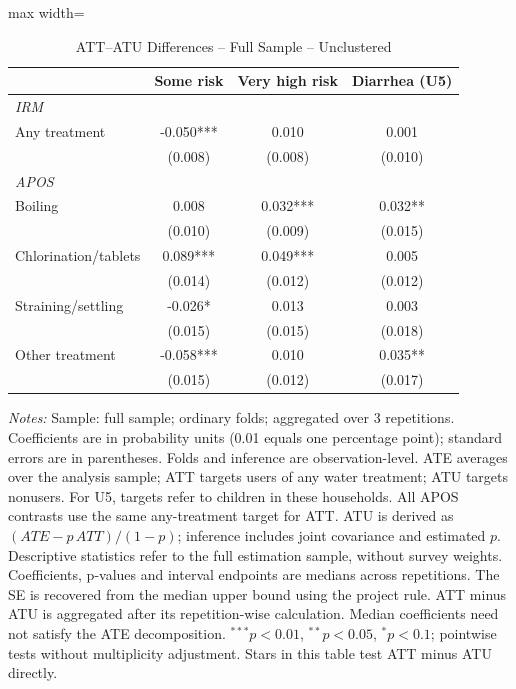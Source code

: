 \documentclass[10pt]{article}
\begin{document}
\clearpage
\begin{table}[H]
\centering
\caption{ATT--ATU Differences -- Full Sample -- Unclustered}
\label{tab:ate-att-atu-iid-aggregated-difference}
\scriptsize
\setlength{\tabcolsep}{4pt}
\renewcommand{\arraystretch}{0.92}
\begin{adjustbox}{max width=\linewidth}
\begin{tabular}{lccc}
\hline\hline
 & Some risk & Very high risk & Diarrhea (U5) \\
\midrule
\multicolumn{4}{l}{\textit{IRM}} \\
Any treatment & -0.050*** & 0.010 & 0.001 \\
 & (0.008) & (0.008) & (0.010) \\
\midrule
\multicolumn{4}{l}{\textit{APOS}} \\
Boiling & 0.008 & 0.032*** & 0.032** \\
 & (0.010) & (0.009) & (0.015) \\
Chlorination/tablets & 0.089*** & 0.049*** & 0.005 \\
 & (0.014) & (0.012) & (0.012) \\
Straining/settling & -0.026* & 0.013 & 0.003 \\
 & (0.015) & (0.015) & (0.018) \\
Other treatment & -0.058*** & 0.010 & 0.035** \\
 & (0.015) & (0.012) & (0.017) \\
\hline\hline
\end{tabular}
\end{adjustbox}
\par\vspace{3pt}
\begin{minipage}{\linewidth}\scriptsize \textit{Notes:} Sample: full sample; ordinary folds; aggregated over 3 repetitions. Coefficients are in probability units (0.01 equals one percentage point); standard errors are in parentheses. Folds and inference are observation-level. ATE averages over the analysis sample; ATT targets users of any water treatment; ATU targets nonusers. For U5, targets refer to children in these households. All APOS contrasts use the same any-treatment target for ATT. ATU is derived as $(ATE-p\,ATT)/(1-p)$; inference includes joint covariance and estimated $p$. Descriptive statistics refer to the full estimation sample, without survey weights. Coefficients, p-values and interval endpoints are medians across repetitions. The SE is recovered from the median upper bound using the project rule. ATT minus ATU is aggregated after its repetition-wise calculation. Median coefficients need not satisfy the ATE decomposition. $^{***}p<0.01$, $^{**}p<0.05$, $^{*}p<0.1$; pointwise tests without multiplicity adjustment. Stars in this table test ATT minus ATU directly.\end{minipage}
\end{table}
\end{document}
